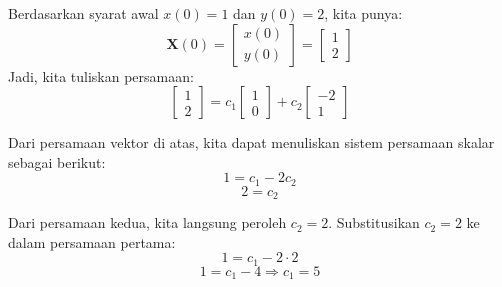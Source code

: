 \documentclass{article}
\begin{document}
\begin{enumerate}
\begin{enumerate}[label=\alph*.]
            Berdasarkan syarat awal \( x(0) = 1 \) dan \( y(0) = 2 \), kita punya:
            \[
            \mathbf{X}(0) = \begin{bmatrix} x(0) \\ y(0) \end{bmatrix} = \begin{bmatrix} 1 \\ 2 \end{bmatrix}
            \]
            Jadi, kita tuliskan persamaan:
            \[
            \begin{bmatrix} 1 \\ 2 \end{bmatrix} = c_1 \begin{bmatrix} 1 \\ 0 \end{bmatrix} + c_2 \begin{bmatrix} -2 \\ 1 \end{bmatrix}
            \]
         
            Dari persamaan vektor di atas, kita dapat menuliskan sistem persamaan skalar sebagai berikut:
            \[
            1 = c_1 - 2c_2
            \]
            \[
            2 = c_2
            \]
         
            Dari persamaan kedua, kita langsung peroleh \( c_2 = 2 \).
            Substitusikan \( c_2 = 2 \) ke dalam persamaan pertama:
            \[
            1 = c_1 - 2 \cdot 2
            \]
            \[
            1 = c_1 - 4 \Rightarrow c_1 = 5
            \]
         

\end{enumerate}
\end{enumerate}
\end{document}
